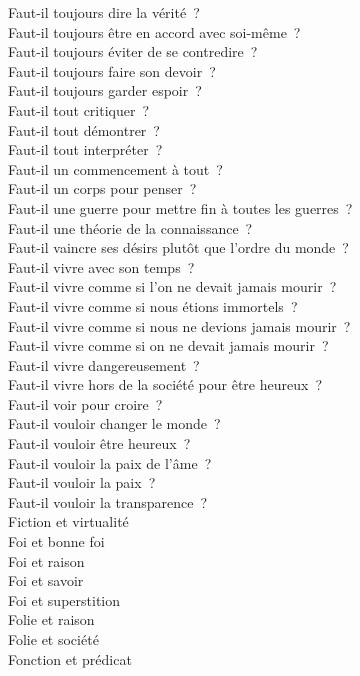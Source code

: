 \documentclass[a4paper,12pt]{article}
\begin{document}
Faut-il toujours dire la vérité ? \\
Faut-il toujours être en accord avec soi-même ? \\
Faut-il toujours éviter de se contredire ? \\
Faut-il toujours faire son devoir ? \\
Faut-il toujours garder espoir ? \\
Faut-il tout critiquer ? \\
Faut-il tout démontrer ? \\
Faut-il tout interpréter ? \\
Faut-il un commencement à tout ? \\
Faut-il un corps pour penser ? \\
Faut-il une guerre pour mettre fin à toutes les guerres ? \\
Faut-il une théorie de la connaissance ? \\
Faut-il vaincre ses désirs plutôt que l'ordre du monde ? \\
Faut-il vivre avec son temps ? \\
Faut-il vivre comme si l'on ne devait jamais mourir ? \\
Faut-il vivre comme si nous étions immortels ? \\
Faut-il vivre comme si nous ne devions jamais mourir ? \\
Faut-il vivre comme si on ne devait jamais mourir ? \\
Faut-il vivre dangereusement ? \\
Faut-il vivre hors de la société pour être heureux ? \\
Faut-il voir pour croire ? \\
Faut-il vouloir changer le monde ? \\
Faut-il vouloir être heureux ? \\
Faut-il vouloir la paix de l'âme ? \\
Faut-il vouloir la paix ? \\
Faut-il vouloir la transparence ? \\
Fiction et virtualité \\
Foi et bonne foi \\
Foi et raison \\
Foi et savoir \\
Foi et superstition \\
Folie et raison \\
Folie et société \\
Fonction et prédicat \\
\end{document}
